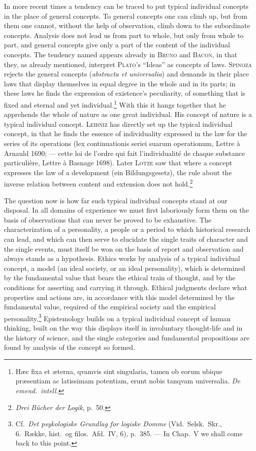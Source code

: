 \documentclass[12pt]{book}
\newcommand{\opage}[1]{\marginnote{\footnotesize\textit{[#1]}}}
\begin{document}
In more recent times a tendency can be traced to put typical individual concepts
in the place of general concepts. To general concepts one can climb up, but from
them one cannot, without the help of observation, climb down to the subordinate
concepts. Analysis does not lead us from part to whole, but only from whole to
part, and general concepts give only a part of the content of the individual
concepts. The tendency named appears already in \textsc{Bruno} and
\textsc{Bacon}, in that they, as already mentioned, interpret \textsc{Plato}'s
``Ideas'' as concepts of laws. \textsc{Spinoza} rejects the general concepts
(\textit{abstracta et universalia}) and demands in their place laws that display
themselves in equal degree in the whole and in its parts; in these laws he finds
the expression of existence's peculiarity, of something that is fixed and eternal
and yet individual.\footnote{Hæc fixa et æterna, qvamvis sint singularia, tamen
ob eorum ubique præsentiam ac latissimam potentiam, erunt nobis tanqvam
universalia. \textit{De emend.\ intell.}} With this it hangs together that he
apprehends the whole of nature as one great individual. His concept of nature is
a typical individual concept. \textsc{Leibniz} has directly set up the typical
individual concept, in that he finds the essence of individuality expressed in
the law for the series of its operations (lex continuationis seriei suarum
operationum, Lettre à Arnauld 1690; --- cette loi de l'ordre qui fait
l'individualité de chaque \opage{34}substance particulière, Lettre à Basnage 1698). Later
\textsc{Lotze} saw that where a concept expresses the law of a development (ein
Bildungsgesetz), the rule about the inverse relation between content and
extension does not hold.\footnote{\textit{Drei Bücher der Logik}, p.\ 50.}

The question now is how far such typical individual concepts stand at our
disposal. In all domains of experience we must first laboriously form them on the
basis of observations that can never be proved to be exhaustive. The
characterization of a personality, a people or a period to which historical
research can lead, and which can then serve to elucidate the single traits of
character and the single events, must itself be won on the basis of report and
observation and always stands as a hypothesis. Ethics works by analysis of a
typical individual concept, a model (an ideal society, or an ideal personality),
which is determined by the fundamental value that bears the ethical train of
thought, and by the conditions for asserting and carrying it through. Ethical
judgments declare what properties and actions are, in accordance with this model
determined by the fundamental value, required of the empirical society and the
empirical personality.\footnote{Cf.\ \textit{Det psykologiske Grundlag for
logiske Domme} (Vid.\ Selsk.\ Skr., 6.\ Række, hist.\ og filos.\ Afd.\ IV, 6),
p.\ 385. --- In Chap.\ V we shall come back to this point.} Epistemology builds
on a typical individual concept of human thinking, built on the way this displays
itself in involuntary thought-life and in the history of science, and the single
categories and fundamental propositions are found by analysis of the concept so
formed.
\end{document}
